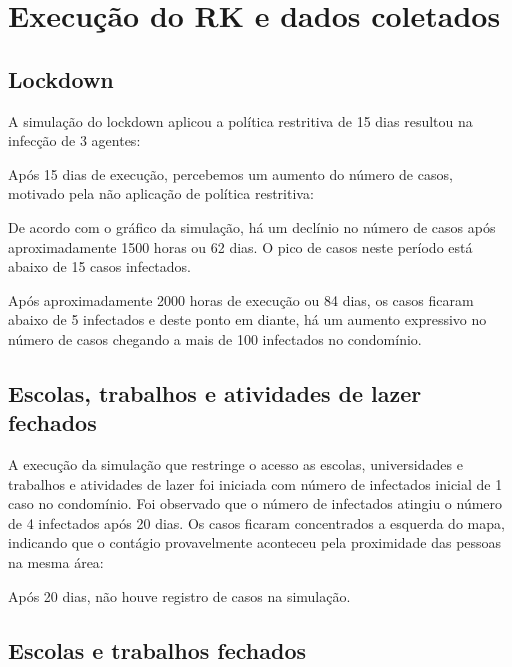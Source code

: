\section{Execução do RK e dados coletados}

\subsection{Lockdown}

A simulação do lockdown aplicou a política restritiva de 15 dias resultou na infecção de 3 agentes:


Após 15 dias de execução, percebemos um aumento do número de casos, motivado pela não aplicação de política restritiva:


De acordo com o gráfico da simulação, há um declínio no número de casos após aproximadamente 1500 horas ou 62 dias. O pico de casos neste período está abaixo de 15 casos infectados.

Após aproximadamente 2000 horas de execução ou 84 dias, os casos ficaram abaixo de 5 infectados e deste ponto em diante, há um aumento expressivo no número de casos chegando a mais de 100 infectados no condomínio.

\subsection{Escolas, trabalhos e atividades de lazer fechados}

A execução da simulação que restringe o acesso as escolas, universidades e trabalhos e atividades de lazer foi iniciada com número de infectados inicial de 1 caso no condomínio. Foi observado que o número de infectados atingiu o número de 4 infectados após 20 dias. Os casos ficaram concentrados a esquerda do mapa, indicando que o contágio provavelmente aconteceu pela proximidade das pessoas na mesma área:


Após 20 dias, não houve registro de casos na simulação.

\subsection{Escolas e trabalhos fechados}

